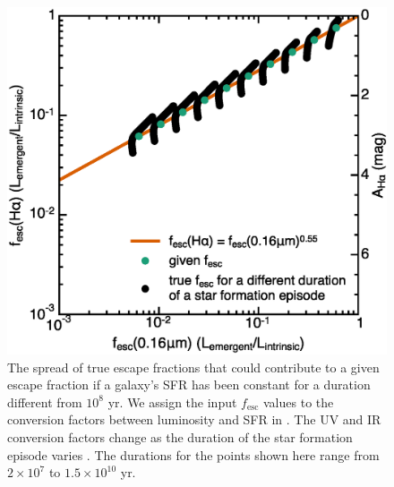 \documentclass[preprint]{aastex}
\begin{document}
\begin{figure}[!ht]
\centering
\includegraphics[scale=0.5]{spread_hauv_age.eps}
\caption{The spread of true escape fractions that could contribute to
a given escape fraction if a galaxy's SFR has been constant for a
duration different from $10^{8}$ yr.  We assign the input
$f_{\mathrm{esc}}$ values to the conversion factors
between luminosity and SFR in \citet{kennicutt98}.  The UV and IR conversion
factors change as the duration of the star formation episode varies \citep{madau14}.
The durations for the points shown here range from $2\times10^{7}$ to
$1.5\times10^{10}$ yr.\label{spread}}
\end{figure}
\end{document}
